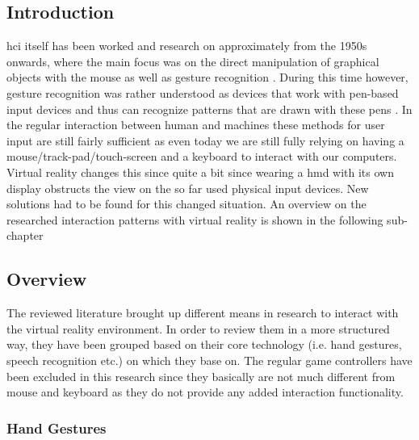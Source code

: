\subsection{Introduction}

\gls{hci} itself has been worked and research on approximately from the 1950s onwards, where the main focus was on the direct manipulation of graphical objects with the mouse as well as gesture recognition \citep{Myers1998}. During this time however, gesture recognition was rather understood as devices that work with pen-based input devices and thus can recognize patterns that are drawn with these pens \citep{Myers1998}. In the regular interaction between human and machines these methods for user input are still fairly sufficient as even today we are still fully relying on having a mouse/track-pad/touch-screen and a keyboard to interact with our computers. \newline
Virtual reality changes this since quite a bit since wearing a \gls{hmd} with its own display obstructs the view on the so far used physical input devices. New solutions had to be found for this changed situation. An overview on the researched interaction patterns with virtual reality is shown in the following sub-chapter



\subsection{Overview}

The reviewed literature brought up different means in research to interact with the virtual reality environment. In order to review them in a more structured way, they have been grouped based on their core technology (i.e. hand gestures, speech recognition etc.) on which they base on. The regular game controllers have been excluded in this research since they basically are not much different from mouse and keyboard as they do not provide any added interaction functionality.


\subsubsection{Hand Gestures}

\label{SubSubSectionHandGestures}

